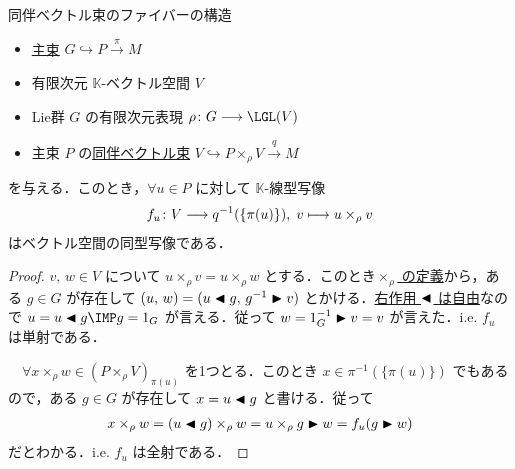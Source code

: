 \documentclass[geometry_main]{subfiles}
\begin{document}
\begin{mylem}[label=lem:assoc-basic,breakable]{同伴ベクトル束のファイバーの構造}
    \begin{itemize}
        \item \hyperref[def.PFD]{主束} $G \hookrightarrow P \xrightarrow{\pi} M$
        \item 有限次元 $\mathbb{K}$-ベクトル空間 $V$
        \item Lie群 $G$ の有限次元表現 $\rho \colon G \lto \LGL(V)$
        \item 主束 $P$ の\hyperref[def:associated-vect]{同伴ベクトル束} $V \hookrightarrow P \times_\rho V \xrightarrow{q} M$
    \end{itemize}
    を与える．このとき，$\forall u \in P$ に対して $\mathbb{K}$-線型写像
    \begin{align}
        f_u \colon V \longrightarrow q^{-1}(\{\pi(u)\}),\; v \longmapsto u \times_\rho v
    \end{align}
    はベクトル空間の同型写像である．
\end{mylem}

\begin{proof}
    $v,\, w \in V$ について $u \times_\rho v = u \times_\rho w$ とする．このとき\hyperref[prop:Borelconst]{$\times_\rho$ の定義}から，ある $g \in G$ が存在して $(u,\, w) = (u \blacktriangleleft g,\, g^{-1} \blacktriangleright v)$ とかける．\hyperref[prop.PFD_right]{右作用 $\blacktriangleleft$ は自由}なので $u = u \btl g \IMP g = 1_G$ が言える．従って $w = 1_G^{-1} \blacktriangleright v = v$ が言えた．i.e. $f_u$ は単射である．

    　$\forall x \times_\rho w \in (P \times_\rho V)_{\pi(u)}$ を1つとる．このとき $x \in \pi^{-1}(\{\pi(u)\})$ でもあるので，ある $g \in G$ が存在して $x = u \blacktriangleleft g$ と書ける．従って
    \begin{align}
        x \times_\rho w = (u \blacktriangleleft g) \times_\rho w = u \times_\rho g \blacktriangleright w = f_u(g \blacktriangleright w)
    \end{align}
    だとわかる．i.e. $f_u$ は全射である．
\end{proof}
\end{document}
